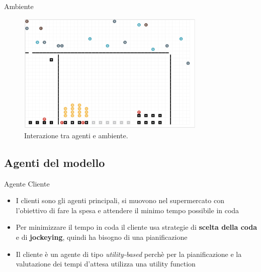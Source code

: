 \begin{frame}{Ambiente}
	\begin{figure}[H]
		\centering
		\includegraphics[width=9cm]{"../report/images/supermarket-execution.png"}
		\caption{Interazione tra agenti e ambiente.}
		\label{fig:supermarket_execution}
	\end{figure}	
\end{frame}


\subsection{Agenti del modello}

\begin{frame}{Agente Cliente}
	\begin{itemize}
		\item I clienti sono gli agenti principali, si muovono nel supermercato con l'obiettivo di fare la spesa e attendere il minimo tempo possibile in coda
		\item Per minimizzare il tempo in coda il cliente usa strategie di \textbf{scelta della coda} e di \textbf{jockeying}, quindi ha bisogno di una pianificazione
		\item Il cliente è un agente di tipo \textit{utility-based} perchè per la pianificazione e la valutazione dei tempi d'attesa utilizza una utility function
	\end{itemize}
\end{frame}

